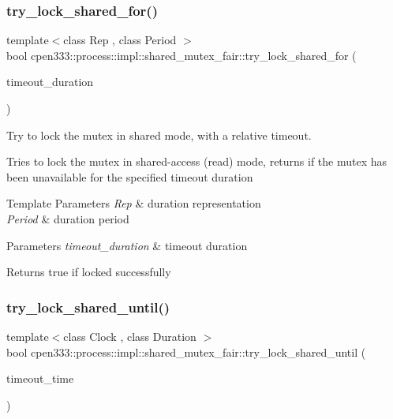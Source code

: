 \subsubsection{\texorpdfstring{try\+\_\+lock\+\_\+shared\+\_\+for()}{try\_lock\_shared\_for()}}
{\footnotesize\ttfamily template$<$class Rep , class Period $>$ \\
bool cpen333\+::process\+::impl\+::shared\+\_\+mutex\+\_\+fair\+::try\+\_\+lock\+\_\+shared\+\_\+for (\begin{DoxyParamCaption}\item[{const std\+::chrono\+::duration$<$ Rep, Period $>$ \&}]{timeout\+\_\+duration }\end{DoxyParamCaption})\hspace{0.3cm}{\ttfamily [inline]}}



Try to lock the mutex in shared mode, with a relative timeout. 

Tries to lock the mutex in shared-\/access (read) mode, returns if the mutex has been unavailable for the specified timeout duration


\begin{DoxyTemplParams}{Template Parameters}
{\em Rep} & duration representation \\
\hline
{\em Period} & duration period \\
\hline
\end{DoxyTemplParams}

\begin{DoxyParams}{Parameters}
{\em timeout\+\_\+duration} & timeout duration \\
\hline
\end{DoxyParams}
\begin{DoxyReturn}{Returns}
true if locked successfully 
\end{DoxyReturn}
\mbox{\label{classcpen333_1_1process_1_1impl_1_1shared__mutex__fair_af45bf5f8271a18b7cf3e737288d38025}} 
\subsubsection{\texorpdfstring{try\+\_\+lock\+\_\+shared\+\_\+until()}{try\_lock\_shared\_until()}}
{\footnotesize\ttfamily template$<$class Clock , class Duration $>$ \\
bool cpen333\+::process\+::impl\+::shared\+\_\+mutex\+\_\+fair\+::try\+\_\+lock\+\_\+shared\+\_\+until (\begin{DoxyParamCaption}\item[{const std\+::chrono\+::time\+\_\+point$<$ Clock, Duration $>$ \&}]{timeout\+\_\+time }\end{DoxyParamCaption})\hspace{0.3cm}{\ttfamily [inline]}}



